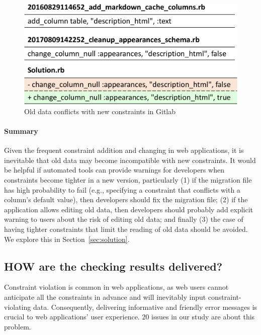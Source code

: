  

\begin{figure}
    \centering
    \includegraphics[width=0.6\columnwidth]{constraints/figs/gitlab-36919-when.pdf}
    \caption{Old data conflicts with new constraints in Gitlab}
    \label{fig:gitlab-36919-when}
\end{figure}

\paragraph{\bf Summary}  Given the frequent constraint addition and changing
in web applications, it is inevitable that old data may
become incompatible with new constraints. It would be helpful if automated 
tools can provide warnings for developers when constraints become
tighter in a new version, particularly (1) if the migration file has high probability to
fail (e.g., specifying a constraint that conflicts with a column's default value), then developers should fix the migration
file; (2) if the application allows editing old data, then developers should probably 
add explicit warning to users about the risk of editing old data; and finally
(3) the case of having tighter constraints that limit the reading of old data should be avoided. We explore this in Section~\ref{sec:solution}.

\subsection{HOW are the checking results delivered?}
\label{subsec:how}

Constraint violation is common in web applications, as web users cannot anticipate all the constraints
in advance and will inevitably input constraint-violating data. Consequently,
delivering informative and friendly error messages is crucial to web applications'
user experience. 20 issues in our study are about this problem. 
 
